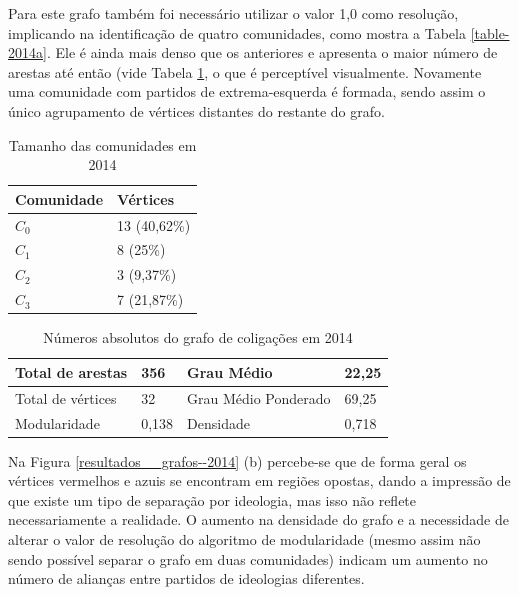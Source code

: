 
Para este grafo também foi necessário utilizar o valor 1,0 como resolução, implicando na identificação de quatro comunidades, como mostra a Tabela \ref{table-2014a}. Ele é ainda mais denso que os anteriores e apresenta o maior número de arestas até então (vide Tabela \ref{table-2014b}, o que é perceptível visualmente. Novamente uma comunidade com partidos de extrema-esquerda é formada, sendo assim o único agrupamento de vértices distantes do restante do grafo. 
\begin{table}[H]
\centering
\label{table-2014b}
\begin{tabular}{|l|l|}
\hline
Comunidade & Vértices \\ \hline
$C_0$         &     13 (40,62\%)                \\ \hline
$C_1$         &     8 (25\%)                \\ \hline
$C_2$         &       3 (9,37\%)               \\ \hline
$C_3$         &       7 (21,87\%)               \\ \hline
\end{tabular}
\caption{Tamanho das comunidades em 2014}
\end{table}


\begin{table}[H]
\centering
\label{table-2010a}
\begin{tabular}{|l|l|l|l|}
\hline
Total de arestas  & 356 & Grau Médio           & 22,25 \\ \hline
Total de vértices & 32 & Grau Médio Ponderado & 69,25 \\ \hline
Modularidade      & 0,138 & Densidade            & 0,718 \\ \hline
\end{tabular}
\caption{Números absolutos do grafo de coligações em 2014}
\end{table}

Na Figura \ref{resultados__grafos--2014} (b) percebe-se que de forma geral os vértices vermelhos e azuis se encontram em regiões opostas, dando a impressão de que existe um tipo de separação por ideologia, mas isso não reflete necessariamente a realidade. O aumento na densidade do grafo e a necessidade de alterar o valor de resolução do algoritmo  de modularidade (mesmo assim não sendo possível separar o grafo em duas comunidades) indicam um aumento no número de alianças entre partidos de ideologias diferentes. 

